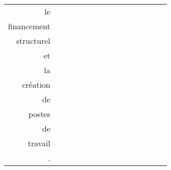 \documentclass{article}
\begin{document}
\begin{tabular}{r*{14}{|@{}c@{}}|}
le & &&&&&&&&&&&&& \\
financement & &&&&&&&&&&&&& \\
structurel & &&&&&&&&&&&&& \\
et & &&&&&&&&&&&&& \\
la & &&&&&&&&&&&&& \\
création & &&&&&&&&&&&&\raisebox{-1ex}{\rule{2.8ex}{2.8ex}}& \\
de & &&&&&&&&&&&&& \\
postes & &&&&&&&&&&&&& \\
de & &&&&&&&&&&&&& \\
travail & &&&&&&&&&&&&& \\
. & &&&&&&&&&&&&&\raisebox{-1ex}{\rule{2.8ex}{2.8ex}} \\
\end{tabular}\\\vspace{3em}
\end{document}
